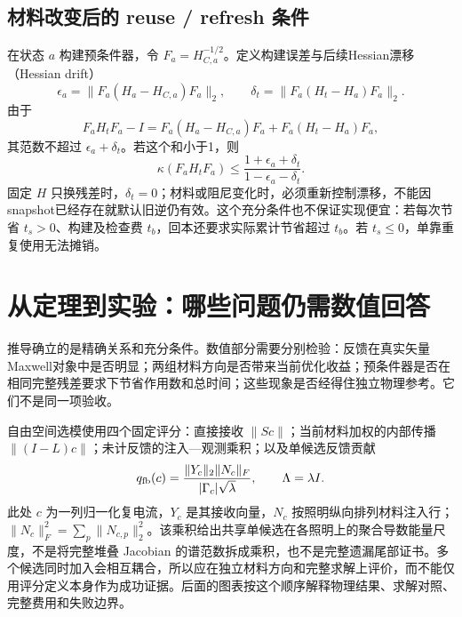 \subsection{材料改变后的 reuse / refresh 条件}
在状态 $a$ 构建预条件器，令 $F_a=H_{C,a}^{-1/2}$。定义构建误差与后续Hessian漂移（Hessian drift）
\begin{equation}
 \epsilon_a=\|F_a(H_a-H_{C,a})F_a\|_2,\qquad
 \delta_t=\|F_a(H_t-H_a)F_a\|_2.
\end{equation}
由于
\begin{equation}
 F_aH_tF_a-I=F_a(H_a-H_{C,a})F_a+F_a(H_t-H_a)F_a,
\end{equation}
其范数不超过 $\epsilon_a+\delta_t$。若这个和小于1，则
\begin{equation}
 \kappa(F_aH_tF_a)\le\frac{1+\epsilon_a+\delta_t}{1-\epsilon_a-\delta_t}.
\end{equation}
固定 $H$ 只换残差时，$\delta_t=0$；材料或阻尼变化时，必须重新控制漂移，不能因snapshot已经存在就默认旧逆仍有效。这个充分条件也不保证实现便宜：若每次节省 $t_s>0$、构建及检查费 $t_b$，回本还要求实际累计节省超过 $t_b$。若 $t_s\le0$，单靠重复使用无法摊销。

\section{从定理到实验：哪些问题仍需数值回答}
推导确立的是精确关系和充分条件。数值部分需要分别检验：反馈在真实矢量Maxwell对象中是否明显；两组材料方向是否带来当前优化收益；预条件器是否在相同完整残差要求下节省作用数和总时间；这些现象是否经得住独立物理参考。它们不是同一项验收。

自由空间选模使用四个固定评分：直接接收 $\|Sc\|$；当前材料加权的内部传播 $\|(I-L)c\|$；未计反馈的注入—观测乘积；以及单候选反馈贡献
\begin{equation}
 q_{\rm fb}(c)=\frac{\|Y_c\|_2\|N_c\|_F}{|\Gamma_c|\sqrt\lambda},\qquad \Lambda=\lambda I.
\end{equation}
此处 $c$ 为一列归一化复电流，$Y_c$ 是其接收向量，$N_c$ 按照明纵向排列材料注入行；$\|N_c\|_F^2=\sum_p\|N_{c,p}\|_2^2$。该乘积给出共享单候选在各照明上的聚合导数能量尺度，不是将完整堆叠 Jacobian 的谱范数拆成乘积，也不是完整遗漏尾部证书。多个候选同时加入会相互耦合，所以应在独立材料方向和完整求解上评价，而不能仅用评分定义本身作为成功证据。后面的图表按这个顺序解释物理结果、求解对照、完整费用和失败边界。

